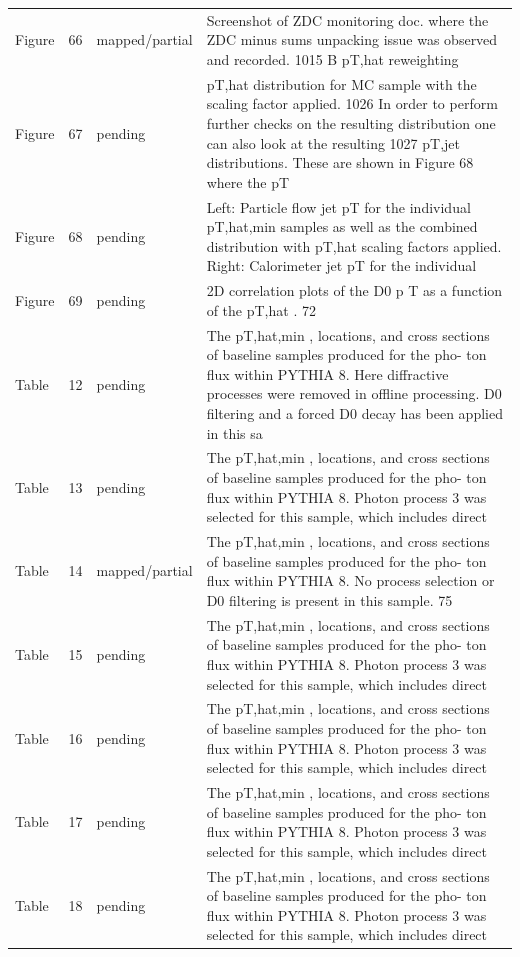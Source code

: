 \documentclass[11pt]{article}
\begin{document}
\begin{longtable}{lll p{}}
Figure & 66 & mapped/partial & Screenshot of ZDC monitoring doc. where the ZDC minus sums unpacking issue was observed and recorded. 1015 B pT,hat reweighting \\
Figure & 67 & pending & pT,hat distribution for MC sample with the scaling factor applied. 1026 In order to perform further checks on the resulting distribution one can also look at the resulting 1027 pT,jet distributions. These are shown in Figure 68 where the pT \\
Figure & 68 & pending & Left: Particle flow jet pT for the individual pT,hat,min samples as well as the combined distribution with pT,hat scaling factors applied. Right: Calorimeter jet pT for the individual \\
Figure & 69 & pending & 2D correlation plots of the D0 p T as a function of the pT,hat . 72 \\
Table & 12 & pending & The pT,hat,min , locations, and cross sections of baseline samples produced for the pho- ton flux within PYTHIA 8. Here diffractive processes were removed in offline processing. D0 filtering and a forced D0 decay has been applied in this sa \\
Table & 13 & pending & The pT,hat,min , locations, and cross sections of baseline samples produced for the pho- ton flux within PYTHIA 8. Photon process 3 was selected for this sample, which includes direct \\
Table & 14 & mapped/partial & The pT,hat,min , locations, and cross sections of baseline samples produced for the pho- ton flux within PYTHIA 8. No process selection or D0 filtering is present in this sample. 75 \\
Table & 15 & pending & The pT,hat,min , locations, and cross sections of baseline samples produced for the pho- ton flux within PYTHIA 8. Photon process 3 was selected for this sample, which includes direct \\
Table & 16 & pending & The pT,hat,min , locations, and cross sections of baseline samples produced for the pho- ton flux within PYTHIA 8. Photon process 3 was selected for this sample, which includes direct \\
Table & 17 & pending & The pT,hat,min , locations, and cross sections of baseline samples produced for the pho- ton flux within PYTHIA 8. Photon process 3 was selected for this sample, which includes direct \\
Table & 18 & pending & The pT,hat,min , locations, and cross sections of baseline samples produced for the pho- ton flux within PYTHIA 8. Photon process 3 was selected for this sample, which includes direct \\

\end{longtable}
\end{document}
